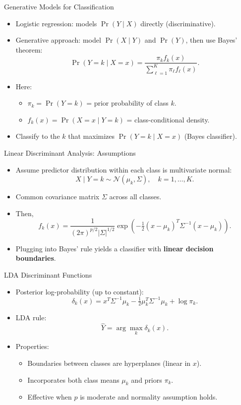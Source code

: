 \documentclass[../../generative_classifiers.tex]{subfiles}
\begin{document}
\begin{frame}{Generative Models for Classification}
\begin{itemize}
    \item Logistic regression: models $\Pr(Y \mid X)$ directly (discriminative).  
    \item Generative approach: model $\Pr(X \mid Y)$ and $\Pr(Y)$, then use Bayes’ theorem:  
    \[
    \Pr(Y=k \mid X=x) = \frac{\pi_k f_k(x)}{\sum_{\ell=1}^K \pi_\ell f_\ell(x)}.
    \]
    \item Here:
    \begin{itemize}
        \item $\pi_k = \Pr(Y=k)$ = prior probability of class $k$.  
        \item $f_k(x) = \Pr(X=x \mid Y=k)$ = class-conditional density.  
    \end{itemize}
    \item Classify to the $k$ that maximizes $\Pr(Y=k \mid X=x)$ (Bayes classifier).  
\end{itemize}
\end{frame}

\begin{frame}{Linear Discriminant Analysis: Assumptions}
\begin{itemize}
    \item Assume predictor distribution within each class is multivariate normal:
    \[
    X \mid Y=k \sim \mathcal{N}(\mu_k, \Sigma), \quad k=1,\dots,K.
    \]
    \item Common covariance matrix $\Sigma$ across all classes.  
    \item Then,
    \[
    f_k(x) = \frac{1}{(2\pi)^{p/2}|\Sigma|^{1/2}}
    \exp\!\left(-\tfrac{1}{2}(x-\mu_k)^T \Sigma^{-1}(x-\mu_k)\right).
    \]
    \item Plugging into Bayes’ rule yields a classifier with \textbf{linear decision boundaries}.
\end{itemize}
\end{frame}

\begin{frame}{LDA Discriminant Functions}
\begin{itemize}
    \item Posterior log-probability (up to constant):
    \[
    \delta_k(x) = x^T \Sigma^{-1}\mu_k - \tfrac{1}{2}\mu_k^T \Sigma^{-1}\mu_k + \log \pi_k.
    \]
    \item LDA rule:
    \[
    \hat{Y} = \arg\max_k \delta_k(x).
    \]
    \item Properties:
    \begin{itemize}
        \item Boundaries between classes are hyperplanes (linear in $x$).  
        \item Incorporates both class means $\mu_k$ and priors $\pi_k$.  
        \item Effective when $p$ is moderate and normality assumption holds.  
    \end{itemize}
\end{itemize}
\end{frame}
\end{document}
